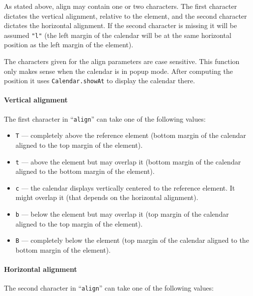 \documentclass[a4paper,twoside,10pt]{dynadoc}
\begin{document}
As stated above, align may contain one or two characters.  The first character
dictates the vertical alignment, relative to the element, and the second
character dictates the horizontal alignment.  If the second character is
missing it will be assumed \texttt{"l"} (the left margin of the calendar will
be at the same horizontal position as the left margin of the element).

The characters given for the align parameters are case sensitive.  This
function only makes sense when the calendar is in popup mode.  After computing
the position it uses \texttt{Calendar.showAt} to display the calendar there.

\paragraph{Vertical alignment}
The first character in ``\texttt{align}'' can take one of the following values:

\begin{itemize}

\item \texttt{T} --- completely above the reference element (bottom margin of
the calendar aligned to the top margin of the element).

\item \texttt{t} --- above the element but may overlap it (bottom margin of the calendar aligned to
the bottom margin of the element).

\item \texttt{c} --- the calendar displays vertically centered to the reference
element.  It might overlap it (that depends on the horizontal alignment).

\item \texttt{b} --- below the element but may overlap it (top margin of the calendar aligned to
the top margin of the element).

\item \texttt{B} --- completely below the element (top margin of the calendar
aligned to the bottom margin of the element).

\end{itemize}

\paragraph{Horizontal alignment}
The second character in ``\texttt{align}'' can take one of the following values:
\end{document}

